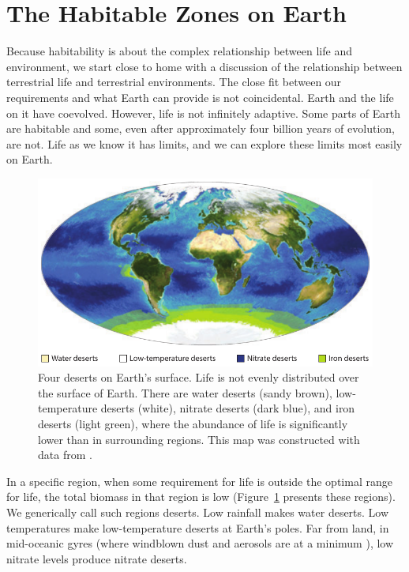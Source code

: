 \clearpage
\section{The Habitable Zones on Earth}\label{sec:HZones}
Because habitability is about the complex relationship between life and environment, we start close to home with a discussion of the relationship between terrestrial life and terrestrial environments. The close fit between our requirements and what Earth can provide is not coincidental. Earth and the life on it have coevolved. However, life is not infinitely adaptive. Some parts of Earth are habitable and some, even after approximately four billion years of evolution, are not. Life as we know it has limits, and we can explore these limits most easily on Earth.

\begin{figure}[!hbt]
	\centering
	\includegraphics[width=0.9\linewidth]{figures/AnnRevs/AR3.pdf}
	\caption[Deserts on Earth]{Four deserts on Earth's surface. Life is not evenly distributed over the surface of Earth. There are water deserts (sandy brown), low-temperature deserts (white), nitrate deserts (dark blue), and iron deserts (light green), where the abundance of life is significantly lower than in surrounding regions. This map was constructed with data from \citet{Stockli2005,McClain2006}.}
	\label{fig:AR3}
\end{figure}

In a specific region, when some requirement for life is outside the optimal range for life, the total biomass in that region is low (Figure~\ref{fig:AR3} presents these regions). We generically call such regions deserts. Low rainfall makes water deserts. Low temperatures make low-temperature deserts at Earth's poles. Far from land, in mid-oceanic gyres (where windblown dust and aerosols are at a minimum \citep{Duce1991}), low nitrate levels produce nitrate deserts. 

